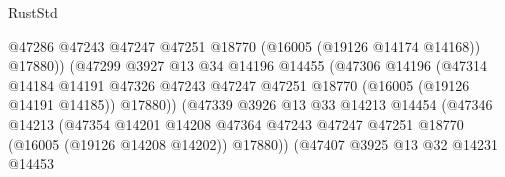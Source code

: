 \begin{lexlean}{RustStd}
\begin{coremodule}
                                            @47286
                                            @47243
                                            @47247
                                            @47251
                                            @18770
                                            (@16005 (@19126 @14174 @14168))
                                            @17880))
                                        (@47299
                                          @3927
                                          @13
                                          @34
                                          @14196
                                          @14455
                                          (@47306
                                            @14196
                                            (@47314
                                              @14184
                                              @14191
                                              @47326
                                              @47243
                                              @47247
                                              @47251
                                              @18770
                                              (@16005 (@19126 @14191 @14185))
                                              @17880))
                                          (@47339
                                            @3926
                                            @13
                                            @33
                                            @14213
                                            @14454
                                            (@47346
                                              @14213
                                              (@47354
                                                @14201
                                                @14208
                                                @47364
                                                @47243
                                                @47247
                                                @47251
                                                @18770
                                                (@16005 (@19126 @14208 @14202))
                                                @17880))
                                            (@47407
                                              @3925
                                              @13
                                              @32
                                              @14231
                                              @14453

\end{coremodule}
\end{lexlean}
